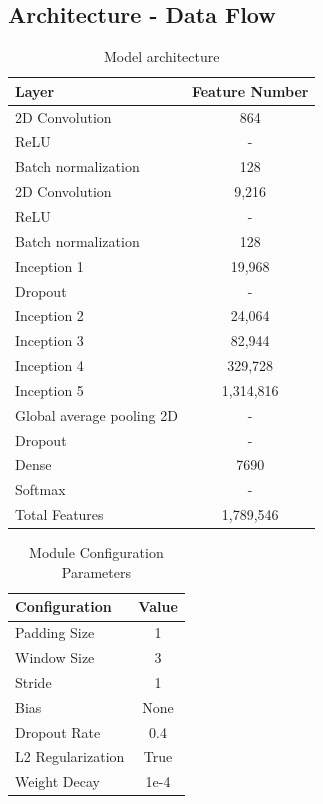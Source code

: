 \documentclass[10pt,twocolumn,letterpaper]{article}
\begin{document}
\subsection{Architecture - Data Flow}
\begin{table}[h!]
\centering
\begin{center}
\begin{tabular}{|l|c|}
\hline
Layer & Feature Number \\
\hline\hline
2D Convolution & 864 \\
ReLU & - \\
Batch normalization & 128 \\
2D Convolution & 9,216 \\
ReLU & - \\
Batch normalization & 128 \\
Inception 1 & 19,968\\
Dropout & -\\
Inception 2 & 24,064\\
Inception 3 & 82,944\\
Inception 4 & 329,728\\
Inception 5 & 1,314,816\\
Global average pooling 2D & -\\
Dropout & -\\
Dense & 7690\\
Softmax & -\\
Total Features & 1,789,546\\
\hline
\end{tabular}
\end{center}
\caption{Model architecture}
\end{table}

\begin{table}[H]
\centering
\begin{center}
\begin{tabular}{|l|c|}
\hline
Configuration & Value \\
\hline\hline
Padding Size & 1 \\
Window Size & 3 \\
Stride & 1 \\
Bias & None \\
Dropout Rate & 0.4 \\
L2 Regularization & True \\
Weight Decay & 1e-4\\
\hline
\end{tabular}
\end{center}
\caption{Module Configuration Parameters}
\end{table}
\end{document}
